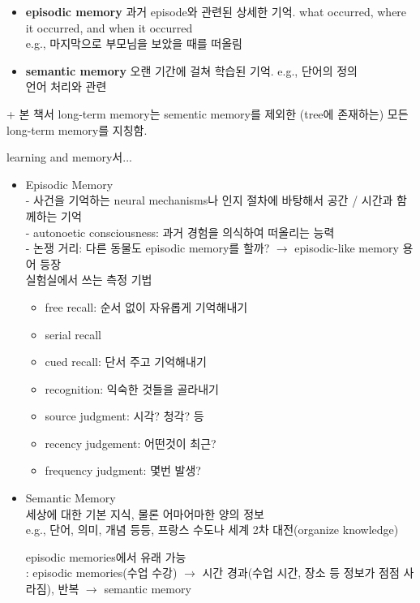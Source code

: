 \documentclass[../note.tex]{subfiles}
\begin{document}
\begin{itemize}
  \item{\textbf{episodic memory}}
    과거 episode와 관련된 상세한 기억. what occurred, where it occurred, and when it occurred\\
    e.g., 마지막으로 부모님을 보았을 때를 떠올림
  \item{\textbf{semantic memory}}
    오랜 기간에 걸쳐 학습된 기억. e.g., 단어의 정의\\
    언어 처리와 관련
\end{itemize}

+ 본 책서 long-term memory는 sementic memory를 제외한 (tree에 존재하는) 모든 long-term memory를 지칭함.

\begin{note}
  learning and memory서...\\
  \begin{itemize}
    \item Episodic Memory\\
      - 사건을 기억하는 neural mechanisms나 인지 절차에 바탕해서 공간 / 시간과 함께하는 기억\\
      - autonoetic consciousness: 과거 경험을 의식하여 떠올리는 능력\\
      - 논쟁 거리: 다른 동물도 episodic memory를 할까? $\rightarrow$ episodic-like memory 용어 등장\\

      실험실에서 쓰는 측정 기법
      \begin{itemize}
        \item free recall: 순서 없이 자유롭게 기억해내기
        \item serial recall
        \item cued recall: 단서 주고 기억해내기
        \item recognition: 익숙한 것들을 골라내기
        \item source judgment: 시각? 청각? 등
        \item recency judgement: 어떤것이 최근?
        \item frequency judgment: 몇번 발생?
      \end{itemize}

    \item Semantic Memory\\
      세상에 대한 기본 지식, 물론 어마어마한 양의 정보\\
      e.g., 단어, 의미, 개념 등등, 프랑스 수도나 세계 2차 대전(organize knowledge)

      episodic memories에서 유래 가능\\
      : episodic memories(수업 수강) $\rightarrow$ 시간 경과(수업 시간, 장소 등 정보가 점점 사라짐), 반복 $\rightarrow$ semantic memory


\end{itemize}
\end{note}
\end{document}
